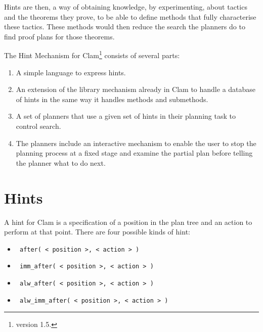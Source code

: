         Hints are then, a way of obtaining knowledge, by experimenting,
about tactics and the theorems they prove, to be able to define methods
that fully characterise these tactics. These methods would then reduce
the search the planners do to find proof plans for those theorems.


        The Hint Mechanism for Clam\footnote{version 1.5.} consists of
several parts:

\begin{enumerate}

\item A simple language to express hints.

\item An extension of the library mechanism already in Clam to handle a
database of hints in the same way it handles methods and submethods.

\item A set of planners that use a given set of hints in their
planning task to control search.

\item The planners include an interactive mechanism to enable the user
to stop the planning process at a fixed stage and examine the partial
plan before telling the planner what to do next.

\end{enumerate}

        
\section{Hints}

        A hint for Clam is a specification of a position in the plan
tree and an action to perform at that point. There are four possible
kinds of hint:

\begin{itemize}

\item \begin{verbatim} after( < position >, < action > ) \end{verbatim}
\item \begin{verbatim} imm_after( < position >, < action > ) \end{verbatim}
\item \begin{verbatim} alw_after( < position >, < action > )\end{verbatim}
\item \begin{verbatim} alw_imm_after( < position >, < action > ) \end{verbatim}

\end{itemize}

